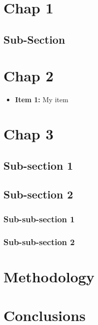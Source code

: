 \documentclass[11pt]{article}
\begin{document}
\section{Chap 1}

\subsection{Sub-Section}


\section{Chap 2}

\begin{itemize}
    \item \textbf{Item 1:} My item \cite{1}

\end{itemize}


\section{Chap 3}

\subsection{Sub-section 1}

\subsection{Sub-section 2}

\subsubsection{Sub-sub-section 1}

\subsubsection{Sub-sub-section 2}

\section{Methodology}





\section{Conclusions}

\listoffigures

\printbibliography
\end{document}
